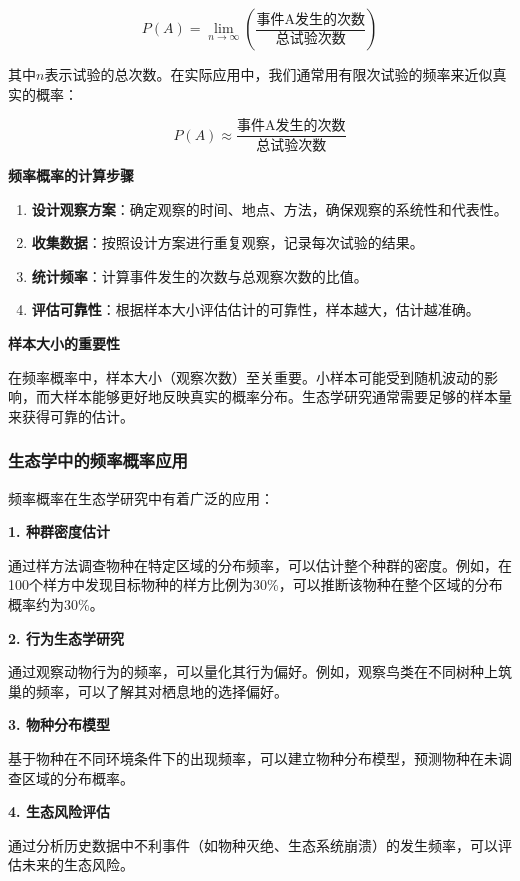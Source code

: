 \documentclass[
  twoside]{book}
\begin{document}
\[P(A) = \lim_{n \to \infty} \left( \frac{\text{事件A发生的次数}}{\text{总试验次数}} \right)\]

其中\(n\)表示试验的总次数。在实际应用中，我们通常用有限次试验的频率来近似真实的概率：

\[P(A) \approx \frac{\text{事件A发生的次数}}{\text{总试验次数}}\]

\textbf{频率概率的计算步骤}

\begin{enumerate}
\def\labelenumi{\arabic{enumi}.}
\item
  \textbf{设计观察方案}：确定观察的时间、地点、方法，确保观察的系统性和代表性。
\item
  \textbf{收集数据}：按照设计方案进行重复观察，记录每次试验的结果。
\item
  \textbf{统计频率}：计算事件发生的次数与总观察次数的比值。
\item
  \textbf{评估可靠性}：根据样本大小评估估计的可靠性，样本越大，估计越准确。
\end{enumerate}

\textbf{样本大小的重要性}

在频率概率中，样本大小（观察次数）至关重要。小样本可能受到随机波动的影响，而大样本能够更好地反映真实的概率分布。生态学研究通常需要足够的样本量来获得可靠的估计。

\hypertarget{ux751fux6001ux5b66ux4e2dux7684ux9891ux7387ux6982ux7387ux5e94ux7528}{%
\subsubsection{生态学中的频率概率应用}\label{ux751fux6001ux5b66ux4e2dux7684ux9891ux7387ux6982ux7387ux5e94ux7528}}

频率概率在生态学研究中有着广泛的应用：

\textbf{1. 种群密度估计}

通过样方法调查物种在特定区域的分布频率，可以估计整个种群的密度。例如，在100个样方中发现目标物种的样方比例为30\%，可以推断该物种在整个区域的分布概率约为30\%。

\textbf{2. 行为生态学研究}

通过观察动物行为的频率，可以量化其行为偏好。例如，观察鸟类在不同树种上筑巢的频率，可以了解其对栖息地的选择偏好。

\textbf{3. 物种分布模型}

基于物种在不同环境条件下的出现频率，可以建立物种分布模型，预测物种在未调查区域的分布概率。

\textbf{4. 生态风险评估}

通过分析历史数据中不利事件（如物种灭绝、生态系统崩溃）的发生频率，可以评估未来的生态风险。
\end{document}
